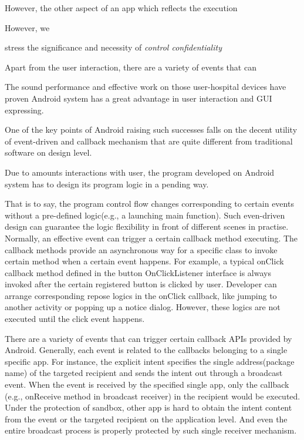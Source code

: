 However, the other aspect of an app which reflects the execution 

However, we 


stress the significance and necessity of \emph{control confidentiality} 





Apart from the user interaction, there are a variety of events that can 






The sound performance and effective work on those user-hospital devices have proven Android system has a great advantage in user interaction and GUI expressing. 


One of the key points of Android raising such successes falls on the decent utility of event-driven and callback mechanism that are quite different from traditional software on design level. 

Due to amounts interactions with user, the program developed on Android system has to design its program logic in a pending way.  

That is to say, the program control flow changes corresponding to certain events without a pre-defined logic(e.g., a launching main function). Such even-driven design can guarantee the logic flexibility in front of different scenes in practise. Normally, an effective event can trigger a certain callback method executing. The callback methods provide an asynchronous way for a specific class to invoke certain method when a certain event happens. For example, a typical onClick callback method defined in the button OnClickListener interface is always invoked after the certain registered button is clicked by user. Developer can arrange corresponding repose logics in the onClick callback, like jumping to another activity or popping up a notice dialog. However, these logics are not executed until the click event happens.

There are a variety of events that can trigger certain callback APIs provided by Android. Generally, each event is related to the callbacks belonging to a single specific app. For instance, the explicit intent specifies the single address(package name) of the targeted recipient and sends the intent out through a broadcast event. When the event is received by the specified single app, only the callback (e.g., onReceive method in broadcast receiver) in the recipient would be executed. Under the protection of sandbox, other app is hard to obtain the intent content from the event or the targeted recipient on the application level. And even the entire broadcast process is properly protected by such single receiver mechanism. 

